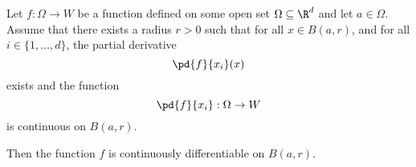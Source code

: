 \begin{proposition}
    Let $f: \Omega \to W$ be a function defined on some open set $\Omega \subseteq \R^d$ and let $a \in \Omega$.
    Assume that there exists a radius $r > 0$ such that for all $x \in B(a,r)$, and for all $i \in \{1,\dots,d\}$,
    the partial derivative
    $$\pd{f}{x_i}(x)$$
    exists and the function
    $$\pd{f}{x_i}: \Omega \to W$$
    is continuous on $B(a,r)$.

    Then the function $f$ is continuously differentiable on $B(a,r)$.
\end{proposition}

